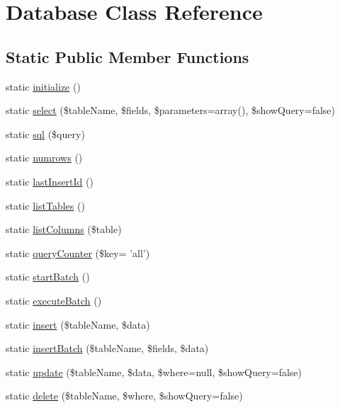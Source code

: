 \hypertarget{classDatabase}{\section{Database Class Reference}
\label{classDatabase}
}
\subsection*{Static Public Member Functions}
\begin{DoxyCompactItemize}
\item 
static \hyperlink{classDatabase_aeb35a95ca65028506f056cc31b1f831b}{initialize} ()
\item 
static \hyperlink{classDatabase_a5b59c182b888f234fd61f9a3949e9345}{select} (\$table\-Name, \$fields, \$parameters=array(), \$show\-Query=false)
\item 
static \hyperlink{classDatabase_a2d56d7358262550987dbdd414e6a3fbf}{sql} (\$query)
\item 
static \hyperlink{classDatabase_a33362cec48e9607bbf635017b10e11c4}{numrows} ()
\item 
static \hyperlink{classDatabase_a53cbcb92396f865972da2ca67384e71f}{last\-Insert\-Id} ()
\item 
static \hyperlink{classDatabase_a6557e3a2f15cfcd074bb800755f73c1e}{list\-Tables} ()
\item 
static \hyperlink{classDatabase_a98b131db77eb8784796a5a27afa62a47}{list\-Columns} (\$table)
\item 
static \hyperlink{classDatabase_a9b1d04fda8f2237633770055be0f3ce9}{query\-Counter} (\$key= 'all')
\item 
static \hyperlink{classDatabase_adc4c49ce3621fc29590e18c43bc13e27}{start\-Batch} ()
\item 
static \hyperlink{classDatabase_a95bc02102d67b1a22261191f772ca19e}{execute\-Batch} ()
\item 
static \hyperlink{classDatabase_a2e123eab6b63bb1321819f60d87ec735}{insert} (\$table\-Name, \$data)
\item 
static \hyperlink{classDatabase_a12b99964867bd77064ee1a2108a068de}{insert\-Batch} (\$table\-Name, \$fields, \$data)
\item 
static \hyperlink{classDatabase_a59e6d46cad7fcba1b20900fb7523d11d}{update} (\$table\-Name, \$data, \$where=null, \$show\-Query=false)
\item 
static \hyperlink{classDatabase_ad555cde4ef0ca37c5dfb9015584bfe9e}{delete} (\$table\-Name, \$where, \$show\-Query=false)
\end{DoxyCompactItemize}


